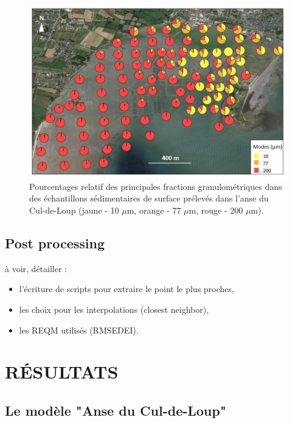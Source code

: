 \documentclass[10pt,a4paper,titlepage]{article}
\begin{document}
\begin{figure}[!h]
    \centering
    \includegraphics[width=0.8\linewidth]{../images/sed_adcl_protec.png}
    \caption[Sédiment de l'anse du Cul-de-Loup]{Pourcentages relatif des principales fractions granulométriques dans des échantillons sédimentaires de surface prélevés dans l'anse du Cul-de-Loup (jaune - 10 $\mu$m, orange - 77 $\mu$m, rouge - 200 $\mu$m).}
    \label{fig:sed-adcl}
\end{figure}


\subsection{Post processing}
\label{sub:postpro}
à voir, détailler :
\begin{itemize}
    \item l'écriture de scripts pour extraire le point le plus proches,
    \item les choix pour les interpolations (closest neighbor),
    \item les REQM utilisés (RMSEDEI).
\end{itemize}


\newpage
\section{RÉSULTATS}
\label{sec:resultats}


\subsection{Le modèle "Anse du Cul-de-Loup"}
\end{document}
